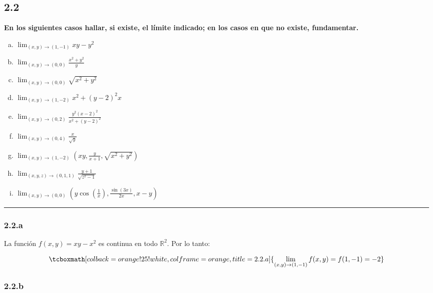 \documentclass{article}
\renewcommand{\Bbb}{\mathbb}
\begin{document}
\subsection*{2.2}
\label{subsec:2.2}

\textbf{En los siguientes casos hallar, si existe, el límite indicado; en los casos en que no existe, fundamentar.} 

\begin{enumerate}[(a)]
\bfseries
\item $ \lim_{(x,y) \rightarrow (1,-1)} xy - y^2 $
\item $ \lim_{(x,y) \rightarrow (0,0)} \frac{x^2 + y^2}{y} $
\item $ \lim_{(x,y) \rightarrow (0,0)} \sqrt{x^2 + y^2} $
\item $ \lim_{(x,y) \rightarrow (1,-2)} x^2 + (y-2)^2 x $
\item $ \lim_{(x,y) \rightarrow (0,2)} \frac{y^2 (x-2)^2}{x^2 + (y-2)^2} $
\item $ \lim_{(x,y) \rightarrow (0,4)} \frac{x}{\sqrt{y}} $
\item $ \lim_{(x,y) \rightarrow (1,-2)} \left( xy, \frac{y}{x+1}, \sqrt{x^2 + y^2} \right) $
\item $ \lim_{(x,y,z) \rightarrow (0,1,1)} \frac{y+1}{\sqrt{z^2 - 1}} $
\item $ \lim_{(x,y) \rightarrow (0,0)} \left( y \cos\left(\frac{1}{x}\right), \frac{\sin(3x)}{2x}, x-y \right) $
\end{enumerate}
\hrule

\subsubsection*{2.2.a}
\label{subsubsec:2.2.a}

La función $f(x,y) = xy - x^2$ es continua en todo $\Bbb R^2$. Por lo tanto:

\begin{equation}
\tcboxmath[colback=orange!25!white,colframe=orange,title=2.2.a]
{ \lim_{(x,y) \rightarrow (1,-1)} f(x,y) = f(1,-1) = -2 }
\end{equation}

\subsubsection*{2.2.b}
\label{subsubsec:2.2.b}
\end{document}
